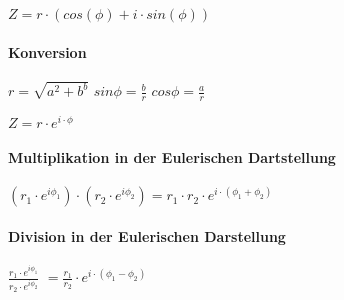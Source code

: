 \documentclass{../tudscript}
\begin{document}
\(Z = r \cdot (cos(\phi) + i \cdot sin(\phi))\)

\hypertarget{konversion}{%
\paragraph{Konversion}\label{konversion}}

\(r = \sqrt{a^{2}+b^{b}}\) \(sin \phi = \frac{b}{r}\)
\(cos \phi = \frac{a}{r}\)

\hypertarget{eulerischeexponentielle-darstellung}{%
\label{eulerischeexponentielle-darstellung}}

\(Z = r \cdot e^{i \cdot \phi}\)

\hypertarget{multiplikation-in-der-eulerischen-dartstellung}{%
\paragraph{Multiplikation in der Eulerischen
Dartstellung}\label{multiplikation-in-der-eulerischen-dartstellung}}

\((r_{1} \cdot e^{i \phi_{1}}) \cdot (r_{2} \cdot e^{i \phi_{2}}) = r_{1} \cdot r_{2} \cdot e^{i \cdot (\phi_{1} + \phi_{2})}\)

\hypertarget{division-in-der-eulerischen-darstellung}{%
\paragraph{Division in der Eulerischen
Darstellung}\label{division-in-der-eulerischen-darstellung}}

\(\frac{r_{1} \cdot e^{i \phi_{1}}}{r_{2} \cdot e^{i \phi_{2}}}\)
\(= \frac{r_{1}}{r_{2}} \cdot e^{i \cdot (\phi_{1} - \phi_{2})}\)
\end{document}
